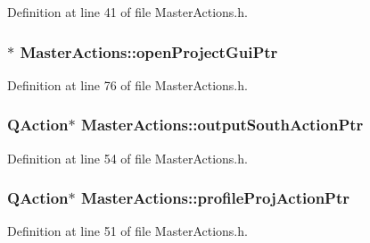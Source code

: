 Definition at line 41 of file Master\-Actions.\-h.

\hypertarget{class_master_actions_a6caf7325dd9cb26f72c81a8c877db634}{
\subsubsection[{open\-Project\-Gui\-Ptr}]{$\ast$ Master\-Actions\-::open\-Project\-Gui\-Ptr\hspace{0.3cm}{\ttfamily [private]}}}\label{class_master_actions_a6caf7325dd9cb26f72c81a8c877db634}


Definition at line 76 of file Master\-Actions.\-h.

\hypertarget{class_master_actions_a5b7a85c6728274eb0fcb48924044b9f6}{
\subsubsection[{output\-South\-Action\-Ptr}]{\setlength{\rightskip}{0pt plus 5cm}Q\-Action$\ast$ Master\-Actions\-::output\-South\-Action\-Ptr\hspace{0.3cm}{\ttfamily [private]}}}\label{class_master_actions_a5b7a85c6728274eb0fcb48924044b9f6}


Definition at line 54 of file Master\-Actions.\-h.

\hypertarget{class_master_actions_a5242e5fa69f4d15c15a32b43f227e397}{
\subsubsection[{profile\-Proj\-Action\-Ptr}]{\setlength{\rightskip}{0pt plus 5cm}Q\-Action$\ast$ Master\-Actions\-::profile\-Proj\-Action\-Ptr\hspace{0.3cm}{\ttfamily [private]}}}\label{class_master_actions_a5242e5fa69f4d15c15a32b43f227e397}


Definition at line 51 of file Master\-Actions.\-h.

